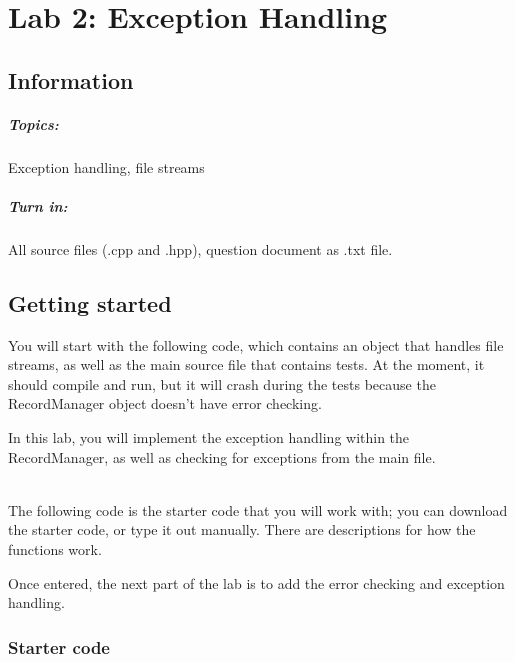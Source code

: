 \documentclass[a4paper,12pt]{book}
\title{}
\author{Rachel Morris}
\date{\today}
\begin{document}
    \chapter*{Lab 2: Exception Handling} 

        \section*{Information}
            \paragraph{ Topics: } Exception handling, file streams
            \paragraph{ Turn in: } All source files (.cpp and .hpp), question document as .txt file. 


        \section*{Getting started}

            You will start with the following code, which contains
            an object that handles file streams, as well as the main
            source file that contains tests.
            At the moment, it should compile and run, but it will crash
            during the tests because the RecordManager object doesn't
            have error checking.

            In this lab, you will implement the exception handling
            within the RecordManager, as well as checking for exceptions
            from the main file.

            ~\\
            The following code is the starter code that you will work with;
            you can download the starter code, or type it out manually.
            There are descriptions for how the functions work.

            Once entered, the next part of the lab is to add the
            error checking and exception handling.

            \newpage{}
            \subsection*{Starter code}
\end{document}
